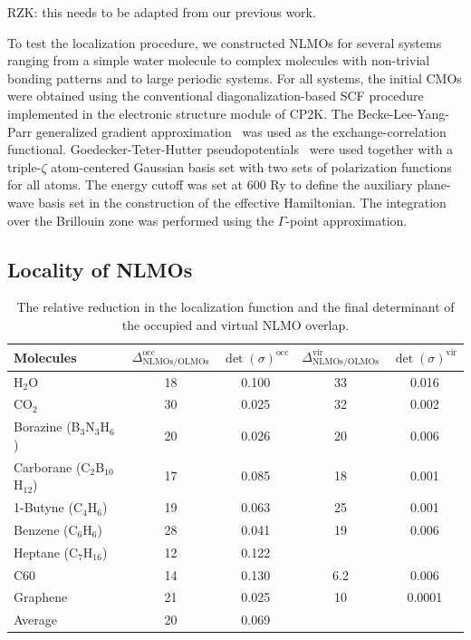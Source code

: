 \documentclass[aps,prl,reprint,amsmath,amssymb]{revtex4-1}
\begin{document}
RZK: this needs to be adapted from our previous work. 

To test the localization procedure, we constructed NLMOs for several systems ranging from a simple water molecule to complex molecules with non-trivial bonding patterns and to large periodic systems. 
For all systems, the initial CMOs were obtained using the conventional diagonalization-based SCF procedure implemented in the electronic structure module of CP2K. 
The Becke-Lee-Yang-Parr generalized gradient approximation~\cite{becke1988density, lee1988development} was used as the exchange-correlation functional.
Goedecker-Teter-Hutter pseudopotentials~\cite{goedecker1996separable} were used together with a triple-$\zeta$ atom-centered Gaussian basis set with two sets of polarization functions for all atoms. 
The energy cutoff was set at 600 Ry to define the auxiliary plane-wave basis set in the construction of the effective Hamiltonian. 
The integration over the Brillouin zone was performed using the $\Gamma$-point approximation.

\subsection{Locality of NLMOs}
 
\begin{table}[htbp]
\caption{The relative reduction in the localization function and the final determinant of the occupied and virtual NLMO overlap.}
\label{tab:loc}
\centering
\begin{tabular}{l c c c c}
\hline\hline
Molecules & $\Delta_{\text{NLMOs/OLMOs}}^{\text{occ}}$ & $\det(\sigma)^{\text{occ}} $ & $\Delta_{\text{NLMOs/OLMOs}}^{\text{vir}}$ & $\det(\sigma)^{\text{vir}}$ \\
\hline
H$_2$O & 18 & 0.100 & 33 & 0.016 \\ 
CO$_2$ & 30 & 0.025 & 32 & 0.002\\
Borazine (B$_3$N$_3$H$_6$) & 20 & 0.026 & 20 & 0.006 \\
Carborane (C$_2$B$_{10}$H$_{12}$) & 17 & 0.085 & 18 & 0.001 \\ 
1-Butyne (C$_4$H$_6$) & 19 & 0.063 & 25 & 0.001 \\
Benzene (C$_6$H$_6$) & 28 & 0.041 & 19 & 0.006 \\ 
Heptane (C$_7$H$_{16}$) & 12 & 0.122 & & \\ 
C60 & 14 & 0.130 & 6.2 & 0.006 \\
Graphene & 21 & 0.025 & 10 & 0.0001 \\
\hline
Average & 20 & 0.069 & & \\
\hline
\hline
\end{tabular}
\label{table:nonlin}
\end{table}
\end{document}
